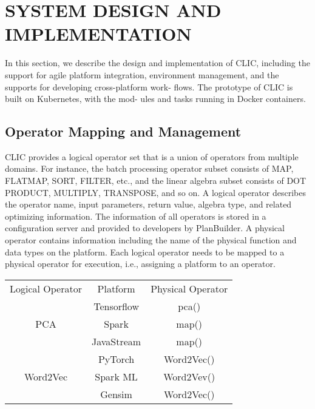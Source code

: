 \section{SYSTEM DESIGN AND IMPLEMENTATION}
In this section, we describe the design and implementation of CLIC, including the support for agile platform integration, environment management, and the supports for developing cross-platform work- flows. 
The prototype of CLIC is built on Kubernetes, with the mod- ules and tasks running in Docker containers.

\subsection{Operator Mapping and Management}
CLIC provides a logical operator set that is a union of operators from multiple domains. 
For instance, the batch processing operator subset consists of MAP, FLATMAP, SORT, FILTER, etc., 
and the linear algebra subset consists of DOT PRODUCT, MULTIPLY, TRANSPOSE, and so on. 
A logical operator describes the operator name, input parameters, return value, algebra type, and related optimizing information. 
The information of all operators is stored in a configuration server and provided to developers by PlanBuilder. 
A physical operator contains information including the name of the physical function and data types on the platform. 
Each logical operator needs to be mapped to a physical operator for execution, i.e., assigning a platform to an operator.

\begin{center}
    \begin{tabular}{ c c c }
        Logical Operator & Platform & Physical Operator \\
        \multirow{3}{2em}{PCA} & Tensorflow & pca() \\
        \multirow{2}{4em}{Map} & Spark & map() \\
         & JavaStream  & map() \\
        \multirow{3}{4em}{Word2Vec} & PyTorch & Word2Vec() \\
         & Spark ML & Word2Vev() \\
         & Gensim & Word2Vec() \\
    \end{tabular}
\end{center}

